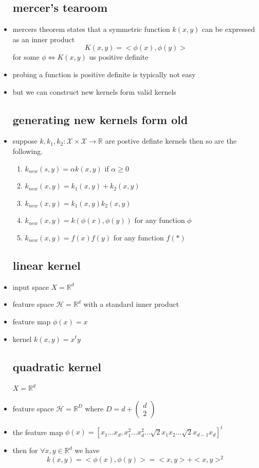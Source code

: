\documentclass{article}
\begin{document}
\begin{itemize}
\subsection{mercer's tearoom }
\item mercers theorem states that a symmetric function $k(x,y)$ can be expressed as an inner product $$K(x,y)=<\phi(x),\phi(y)>$$ for some $\phi\iff K(x,y)$ us positive definite 
\item probing a function is positive definite is typically not easy 
\item but we can construct new kernels form valid kernels 
\subsection{generating new kernels form old}
\item suppose $k,k_1,k_2:\mathcal{X}\times \mathcal{X}\rightarrow \mathbb{R}$ are postive definte kernels then so are the following. 
\begin{enumerate}
    \item $k_{new}(s,y)=\alpha k(x,y) $ if $\alpha\geq 0$
    \item $k_{new}(x,y)=k_1(x,y)+k_2(x,y)$
    \item $k_{new}(x,y)=k_1(x,y)k_2(x,y)$
    \item $k_{new}(x,y)=k(\phi(x), \phi(y))$ for any function $\phi$
    \item $k_{new}(x,y)=f(x)f(y)$ for any function $f(*)$
\end{enumerate}
\subsection{linear kernel}
\item input space $X=\mathbb{R}^{d}$
\item feature space $\mathcal{H}=\mathbb{R}^{d}$ with a standard inner product 
\item feature map $\phi(x)=x$
\item kernel $k(x,y)=x^{t}y$ 
\subsection{quadratic kernel}
$X=\mathbb{R}^{d}$
\item feature space $\mathcal{H}=\mathbb{R}^{D}$ where $D=d+\begin{pmatrix}
    d\\2
\end{pmatrix}$ 
\item the feature map $\phi(x)=[x_1...x_d, x_1^2...x_d^2...\sqrt{2}x_1x_2...\sqrt{2}x_{d-1}x_{d}]^{t}$
\item then for $\forall x,y\in \mathbb{R}^{d} $ we have $$k(x,y)=<\phi(x),\phi(y)>=<x,y>+<x,y>^{2}$$

\end{itemize}
\end{document}
